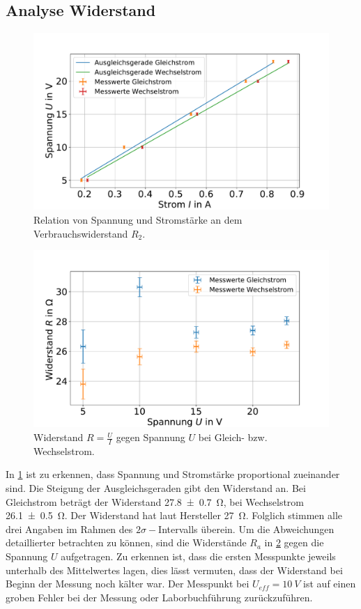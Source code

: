 \subsection{Analyse Widerstand} 



\begin{figure}[h]
	\centering
	\includegraphics[width=0.9\linewidth]{"auswertung/Auswertung Innenwiderstand/Widerstand R2 B"}
	\caption{Relation von Spannung und Stromstärke an dem Verbrauchswiderstand $R_2$.}
	\label{fig:widerstand-r2}
\end{figure}



\begin{figure}[h]
	\centering
	\includegraphics[width=0.9\linewidth]{"auswertung/Auswertung Innenwiderstand/WiderstandR2 A"}
	\caption{Widerstand $R=\frac{U}{I}$ gegen Spannung $U$ bei Gleich- bzw. Wechselstrom.}
	\label{fig:widerstandr2-a}
\end{figure}


In \cref{fig:widerstand-r2} ist zu erkennen, dass Spannung und Stromstärke proportional zueinander sind. Die Steigung der Ausgleichsgeraden gibt den Widerstand an. Bei Gleichstrom beträgt der Widerstand \SI{27.8+-0.7}{\ohm}, bei Wechselstrom \SI{26.1+- 0.5}{\ohm}. Der Widerstand hat laut Hersteller \SI{27}{\ohm}. Folglich stimmen alle drei Angaben im Rahmen des $2\sigma-$Intervalls überein. Um die Abweichungen detaillierter betrachten zu können, sind die Widerstände $R_a$ in \cref{fig:widerstandr2-a} gegen die Spannung $U$ aufgetragen. Zu erkennen ist, dass die ersten Messpunkte jeweils unterhalb des Mittelwertes lagen, dies lässt vermuten, dass der Widerstand bei Beginn der Messung noch kälter war. Der Messpunkt bei  $U_{eff}= \SI{10}{V}$ ist auf einen groben Fehler bei der Messung oder Laborbuchführung zurückzuführen.\\



